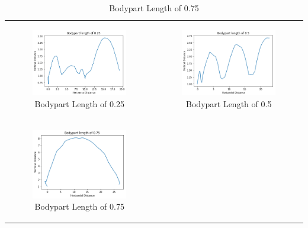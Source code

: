 \documentclass[12pt,oneside,listof=totoc,paper=a4,headings=small]{scrbook}
\begin{document}
{\centering
\begin{table}[h!]
\begin{tabular}{cc}
\begin{subfigure}{0.4\textwidth}\centering\includegraphics[width=0.75\columnwidth]{images/length_025.png}\caption{Bodypart Length of 0.25}\label{fig:lengthtaba}\end{subfigure}&
\begin{subfigure}{0.4\textwidth}\centering\includegraphics[width=0.75\columnwidth]{images/length_05.png}\caption{Bodypart Length of 0.5}\label{fig:lengthtabb}\end{subfigure}\\
\newline
\begin{subfigure}{0.4\textwidth}\centering\includegraphics[width=0.75\columnwidth]{images/length_075_1.png}\caption{Bodypart Length of 0.75}\label{fig:lengthtabc}\end{subfigure}&

\end{tabular}
\end{table}}
\end{document}
